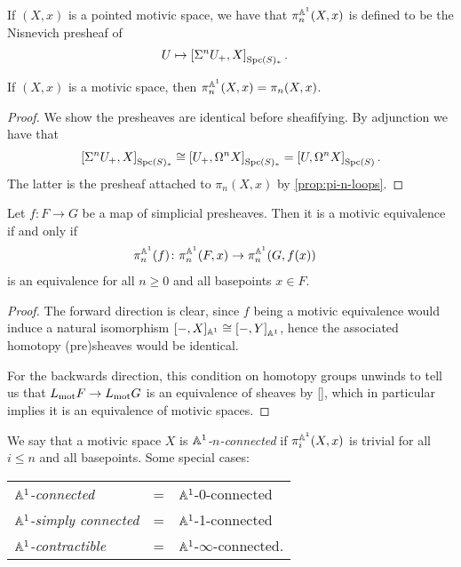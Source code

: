 \documentclass[11pt]{amsart}
\begin{document}
\begin{definition} If $(X,x)$ is a pointed motivic space, we have that $\pi_n^{\mathbb{A}^1}(X,x)$ is defined to be the Nisnevich presheaf of
\begin{align*}
    U &\mapsto \left[ \Sigma^n U_+, X \right]_{\mathrm{Spc}(S)_\ast}.
\end{align*}
\end{definition}

\begin{proposition} If $(X,x)$ is a motivic space, then $\pi_n^{\mathbb{A}^1}(X,x) = \pi_n(X,x)$.
\end{proposition}
\begin{proof} We show the presheaves are identical before sheafifying. By adjunction we have that
\begin{align*}
    \left[ \Sigma^n U_+, X \right]_{\mathrm{Spc}(S)_\ast} \cong \left[ U_+, \Omega^n X \right]_{\mathrm{Spc}(S)_\ast} = \left[ U, \Omega^n X \right]_{\mathrm{Spc}(S)}.
\end{align*}
The latter is the presheaf attached to $\pi_n(X,x)$ by \autoref{prop:pi-n-loops}.
\end{proof}

\begin{proposition} Let $f\colon F\to G$ be a map of simplicial presheaves. Then it is a motivic equivalence if and only if
\begin{align*}
    \pi_n^{\mathbb{A}^1}(f) \colon \pi_n^{\mathbb{A}^1}(F,x) &\to \pi_n^{\mathbb{A}^1}(G,f(x))
\end{align*}
is an equivalence for all $n\ge0$ and all basepoints $x\in F$.
\end{proposition}
\begin{proof} The forward direction is clear, since $f$ being a motivic equivalence would induce a natural isomorphism $[-,X]_{\mathbb{A}^1} \cong \left[ -,Y \right]_{\mathbb{A}^1}$, hence the associated homotopy (pre)sheaves would be identical.

For the backwards direction, this condition on homotopy groups unwinds to tell us that $L_{\mathrm{mot}} F \to L_{\mathrm{mot}} G$ is an equivalence of sheaves by \autoref{}, which in particular implies it is an equivalence of motivic spaces.
\end{proof}

\begin{terminology} We say that a motivic space $X$ is $\mathbb{A}^1$\textit{-$n$-connected} if $\pi_i^{\mathbb{A}^1}(X,x)$ is trivial for all $i\le n$ and all basepoints. Some special cases:
\begin{center}
    \begin{tabular}{l l l}
    $\mathbb{A}^1$\textit{-connected} &= & $\mathbb{A}^1$-0-connected \\
    $\mathbb{A}^1$\textit{-simply connected} &= & $\mathbb{A}^1$-1-connected \\
    $\mathbb{A}^1$\textit{-contractible} &= & $\mathbb{A}^1$-$\infty$-connected.
    \end{tabular}
\end{center}
\end{terminology}
\end{document}
